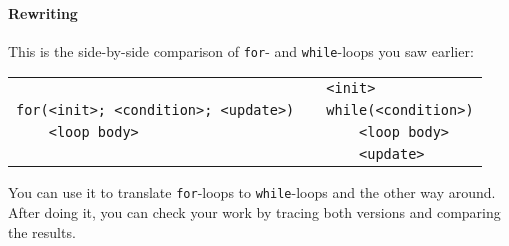 \paragraph{Rewriting} This is the side-by-side comparison of \texttt{for}- and \texttt{while}-loops you saw earlier:

\begin{tabular}{lp{4em}l}
                                         && \verb|<init>| \\
\verb|for(<init>|\verb|; <condition>|\verb|; <update>|\verb|)|
&& \verb|while|\verb|(<condition>)| \\
\verb|    <loop body>|             && \verb|    <loop body>| \\
                                         && \verb|    |\verb|<update>|
\end{tabular}

You can use it to translate \texttt{for}-loops to \texttt{while}-loops and the other way around. After doing it, you can check your work by tracing both versions and comparing the results.
